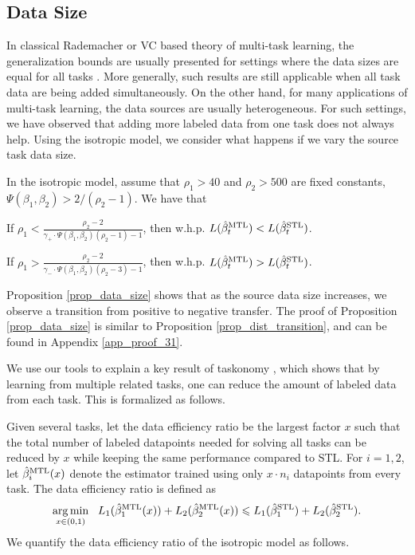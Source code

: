 \subsection{Data Size}
In classical Rademacher or VC based theory of multi-task learning, the generalization bounds are usually presented for settings where the data sizes are equal for all tasks \cite{B00,M06,MPR16}.
More generally, such results are still applicable when all task data are being added simultaneously.
On the other hand, for many applications of multi-task learning, the data sources are usually heterogeneous.
For such settings, we have observed that adding more labeled data from one task does not always help.
Using the isotropic model, we consider what happens if we vary the source task data size.

\begin{proposition}\label{prop_data_size}
	In the isotropic model, assume that $\rho_1 > 40$ and $\rho_2 > 500$ are fixed constants, $\Psi(\beta_1, \beta_2) > 2/(\rho_2 - 1)$.
	We have that
	\squishlist
		\item If $\rho_1 < \frac{\rho_2-2}{\gamma_+ \cdot \Psi(\beta_1, \beta_2) (\rho_2 - 1) - 1}$, then w.h.p. $L(\hat{\beta}_t^{\text{MTL}}) < L(\hat{\beta}_t^{\text{STL}})$.
		\item If $\rho_1 > \frac{\rho_2-2}{\gamma_- \cdot \Psi(\beta_1, \beta_2) (\rho_2 - 3) - 1}$, then w.h.p. $L(\hat{\beta}_t^{\text{MTL}}) > L(\hat{\beta}_t^{\text{STL}})$.
	\squishend
\end{proposition}
Proposition \ref{prop_data_size} shows that as the source data size increases, we observe a transition from positive to negative transfer.
The proof of Proposition \ref{prop_data_size} is similar to Proposition \ref{prop_dist_transition}, and can be found in Appendix \ref{app_proof_31}.


We use our tools to explain a key result of taskonomy \cite{ZSSGM18}, which shows that by learning from multiple related tasks, one can reduce the amount of labeled data from each task.
This is formalized as follows.

Given several tasks, let the data efficiency ratio be the largest factor $x$ such that the total number of labeled datapoints needed for solving all tasks can be reduced by $x$ while keeping the same performance compared to STL.
For $i = 1, 2$, let $\hat{\beta}_i^{\text{MTL}}(x)$ denote the estimator trained using only $x \cdot n_i$ datapoints from every task.
The data efficiency ratio is defined as
\[ \operatorname*{arg\,min}_{x\in(0, 1)} ~~
		L_1(\hat{\beta}_1^{\text{MTL}}(x)) + L_2(\hat{\beta}_2^{\text{MTL}}(x))
		\leqslant L_1(\hat{\beta}_1^{\text{STL}}) + L_2(\hat{\beta}_2^{\text{STL}}). \]
We quantify the data efficiency ratio of the isotropic model as follows.

